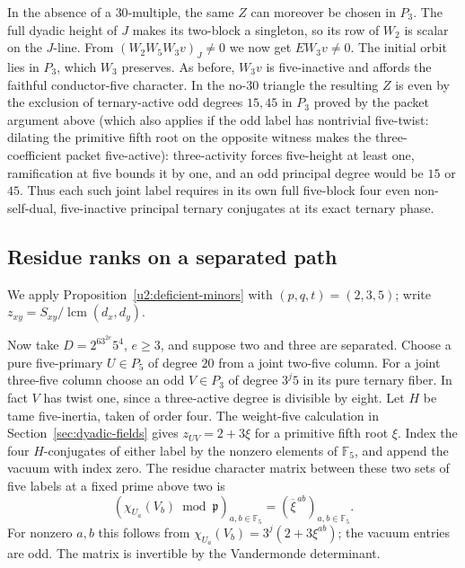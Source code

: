 \documentclass[11pt,a4paper]{article}
\numberwithin{equation}{section}
\theoremstyle{remark}
\begin{document}
In the absence of a $30$-multiple, the same $Z$ can moreover be
chosen in $P_3$. The full dyadic height of $J$ makes its two-block
a singleton, so its row of $W_2$ is scalar on the $J$-line. From
$(W_2W_5W_3v)_J\ne0$ we now get $E W_3v\ne0$. The initial
orbit lies in $P_3$, which $W_3$ preserves. As before, $W_3v$ is
five-inactive and affords the faithful conductor-five character.
In the no-$30$ triangle the resulting $Z$ is even by the exclusion
of ternary-active odd degrees $15,45$ in $P_3$ proved by the packet argument above (which also applies if the odd label has nontrivial five-twist: dilating the primitive fifth root on the opposite witness makes the three-coefficient packet five-active):
three-activity forces five-height at least one, ramification at five
bounds it by one, and an odd principal degree would be $15$ or $45$.
Thus each such joint label requires in its own full five-block four
even non-self-dual, five-inactive principal ternary conjugates at
its exact ternary phase.

\subsection{Residue ranks on a separated path}\label{found:F:4}
We apply Proposition~\ref{u2:deficient-minors} with
$(p,q,t)=(2,3,5)$; write $z_{xy}=S_{xy}/\operatorname{lcm}(d_x,d_y)$.

Now take $D=2^63^{2e}5^4$, $e\ge3$, and suppose two and three are
separated. Choose a pure five-primary $U\in P_5$ of degree $20$
from a joint two-five column. For a joint three-five column choose
an odd $V\in P_3$ of degree $3^j5$ in its pure ternary fiber.
In fact $V$ has twist one, since a three-active degree is divisible
by eight. Let $H$ be tame five-inertia, taken of order four.
The weight-five calculation in Section~\ref{sec:dyadic-fields} gives
$z_{UV}=2+3\xi$ for a primitive fifth root $\xi$.
Index the four $H$-conjugates of either label by the nonzero
elements of $\mathbb F_5$, and append the vacuum with index zero.
The residue character matrix between these two sets of five labels
at a fixed prime above two is
\[
        (\chi_{U_a}(V_b)\bmod\mathfrak p)_{a,b\in\mathbb F_5}
                =(\overline{\xi}^{\,ab})_{a,b\in\mathbb F_5}.
\]
For nonzero $a,b$ this follows from
$\chi_{U_a}(V_b)=3^j(2+3\xi^{ab})$; the vacuum entries are odd.
The matrix is invertible by the Vandermonde determinant.
\end{document}
